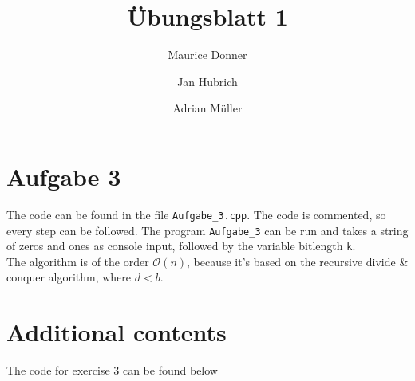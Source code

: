 \documentclass{article}
\title{\textsf{\color{blue!40!black}Übungsblatt 1}}
\author{Maurice Donner \and Jan Hubrich \and Adrian Müller}
\begin{document}
\maketitle



\section*{Aufgabe 3}
The code can be found in the file \texttt{Aufgabe\_3.cpp}. The code is commented,
so every step can be followed. The program \texttt{Aufgabe\_3} can be run
and takes a string of zeros and ones as console input, followed by the
variable bitlength \texttt{k}.\\
The algorithm is of the order \( \mathcal{O}(n) \), because it's based
on the recursive divide \& conquer algorithm, where \( d < b \).



\section*{Additional contents}
The code for exercise 3 can be found below
\end{document}

